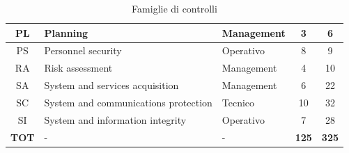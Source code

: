 \documentclass[../main.tex]{subfiles}
\begin{document}
\begin{table}[h]
\begin{tabulary}{\textwidth}{|C|L|L|C|C|}
    PL            & Planning                                            & \scriptsize{Management}      & 3                      & 6                         \\ \hline
    PS            & Personnel security                                  & \scriptsize{Operativo}       & 8                      & 9                         \\ \hline
    RA            & Risk assessment                                     & \scriptsize{Management}      & 4                      & 10                        \\ \hline
    SA            & System and services acquisition                     & \scriptsize{Management}      & 6                      & 22                        \\ \hline
    SC            & System and communications protection                & \scriptsize{Tecnico}         & 10                     & 32                        \\ \hline
    SI            & System and information integrity                    & \scriptsize{Operativo}       & 7                      & 28                        \\ \hline \hline
    \textbf{TOT } & -                                                   & -               & \textbf{125}           & \textbf{325}              \\ \hline
    \end{tabulary}
    \caption{Famiglie di controlli\cite{fedrampLowSC}\cite{fedrampModSC}}\label{tab:80053fedrampfamilies}
\end{table}
\end{document}
